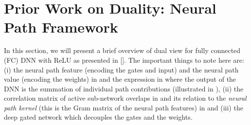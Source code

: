 \section{Prior Work on Duality: Neural Path Framework}\label{sec:dual}
In this section, we will present a brief overview of dual view for fully connected (FC) DNN with ReLU as presented in []. The important things to note here are: (i) the neural path feature (encoding the gates and input) and the neural path value (encoding the weights) in and the expression in  where the output of the DNN is the summation of individual path contributions (illustrated in ), (ii) the correlation matrix of active sub-network overlaps in  and its relation to the \emph{neural path kernel} (this is the Gram matrix of the neural path features) in  and (iii) the deep gated network which decouples the gates and the weights.

